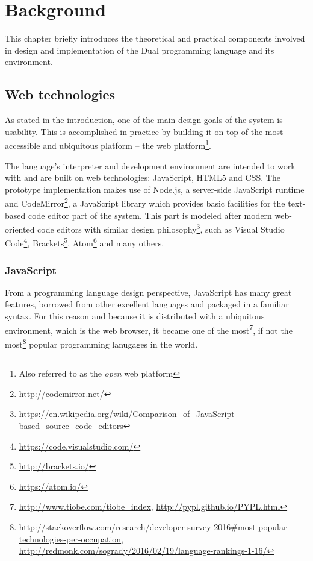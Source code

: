 \chapter{Background}\label{chap:background}
This chapter briefly introduces the theoretical and practical components
involved in design and implementation of the Dual programming language and its
environment. 

\section{Web technologies}
As stated in the introduction, one of the main design goals of the system is usability.
This is
accomplished in practice by building it on top of the most accessible and
ubiquitous platform -- the web
platform\cite{web_platform}\footnote{Also referred to as the \textit{open} web platform\cite{open_web_platform}}.

The language's interpreter and development environment are intended to work with
and are built on web technologies: JavaScript, HTML5 and CSS. The prototype
implementation makes use of Node.js, a server-side JavaScript runtime and
CodeMirror\footnote{\url{http://codemirror.net/}}, a JavaScript library which
provides basic facilities for the text-based code editor part of the
system. This part is modeled after modern web-oriented code editors with similar
design
philosophy\footnote{\url{https://en.wikipedia.org/wiki/Comparison_of_JavaScript-based_source_code_editors}},
such as Visual Studio Code\footnote{\url{https://code.visualstudio.com/}},
Brackets\footnote{\url{http://brackets.io/}},
Atom\footnote{\url{https://atom.io/}} and many others.

\subsection{JavaScript}
From a programming language design perspective, JavaScript has many great
features, borrowed from other excellent languages and packaged in a familiar
syntax. For this reason and because it is distributed with a ubiquitous
environment, which is the web browser, it became one of the
most\footnote{\url{http://www.tiobe.com/tiobe_index},
  \url{http://pypl.github.io/PYPL.html}}, if not the
most\footnote{\url{http://stackoverflow.com/research/developer-survey-2016\#most-popular-technologies-per-occupation},
  \url{http://redmonk.com/sogrady/2016/02/19/language-rankings-1-16/}} popular
programming lanugages in the world.

